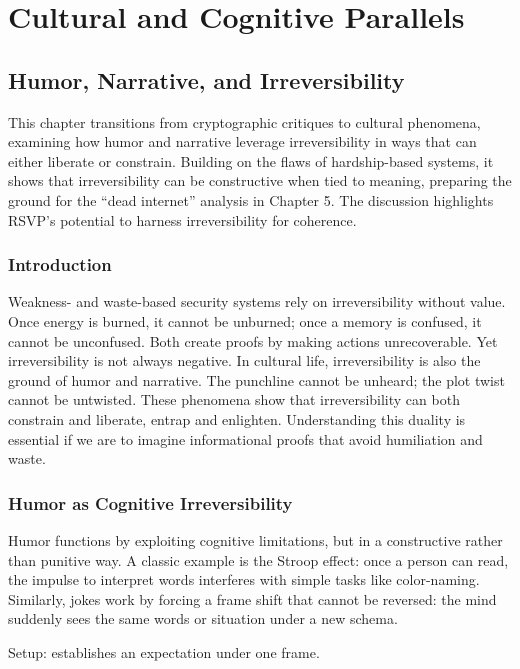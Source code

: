\documentclass{book}
\begin{document}
\part{Cultural and Cognitive Parallels}

\chapter{Humor, Narrative, and Irreversibility}

This chapter transitions from cryptographic critiques to cultural phenomena, examining how humor and narrative leverage irreversibility in ways that can either liberate or constrain. Building on the flaws of hardship-based systems, it shows that irreversibility can be constructive when tied to meaning, preparing the ground for the ``dead internet'' analysis in Chapter 5. The discussion highlights RSVP’s potential to harness irreversibility for coherence.

\section{Introduction}

Weakness- and waste-based security systems rely on irreversibility without value. Once energy is burned, it cannot be unburned; once a memory is confused, it cannot be unconfused. Both create proofs by making actions unrecoverable. Yet irreversibility is not always negative. In cultural life, irreversibility is also the ground of humor and narrative. The punchline cannot be unheard; the plot twist cannot be untwisted. These phenomena show that irreversibility can both constrain and liberate, entrap and enlighten. Understanding this duality is essential if we are to imagine informational proofs that avoid humiliation and waste.

\section{Humor as Cognitive Irreversibility}

Humor functions by exploiting cognitive limitations, but in a constructive rather than punitive way. A classic example is the Stroop effect: once a person can read, the impulse to interpret words interferes with simple tasks like color-naming. Similarly, jokes work by forcing a frame shift that cannot be reversed: the mind suddenly sees the same words or situation under a new schema.

Setup: establishes an expectation under one frame.
\end{document}
